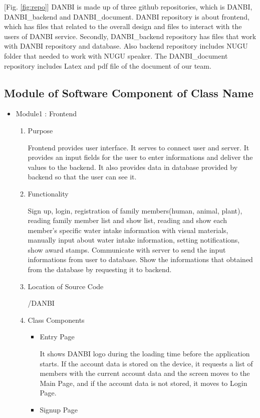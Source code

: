 \documentclass[conference]{IEEEtran}
\begin{document}
[Fig. \ref{fig:repo}] DANBI is made up of three github repositories, which is DANBI, DANBI\_backend and DANBI\_document. DANBI repository is about frontend, which has files that related to the overall design and files to interact with the users of DANBI service. Secondly, DANBI\_backend repository has files that work with DANBI repository and database. Also backend repository includes NUGU folder that needed to work with NUGU speaker. The DANBI\_document repository includes Latex and pdf file of the document of our team.

\subsection{Module of Software Component of Class Name}
\setlength{\parindent}{2ex}

\begin{itemize}
    \item Module1 : Frontend
    \begin{enumerate}
    \setlength{\parindent}{2ex}
    \setlength{\parskip}{0.5em}
        \item Purpose
        
        Frontend provides user interface. It serves to connect user and server. It provides an input fields for the user to enter informations and deliver the values to the backend. It also provides data in database provided by backend so that the user can see it.
        \item Functionality
        
        Sign up, login, registration of family members(human, animal, plant), reading family member list and show list, reading and show each member's specific water intake information with visual materials, manually input about water intake information, setting notifications, show award stamps. Communicate with server to send the input informations from user to database. Show the informations that obtained from the database by requesting it to backend.
        \item Location of Source Code
        
        /DANBI
        \item Class Components
        \begin{itemize}
            \item Entry Page
            \setlength{\parindent}{2ex}
            
            It shows DANBI logo during the loading time before the application starts. If the account data is stored on the device, it requests a list of members with the current account data and the screen moves to the Main Page, and if the account data is not stored, it moves to Login Page.
            \item Signup Page
            \setlength{\parindent}{2ex}
            

\end{itemize}
\end{enumerate}
\end{itemize}
\end{document}
